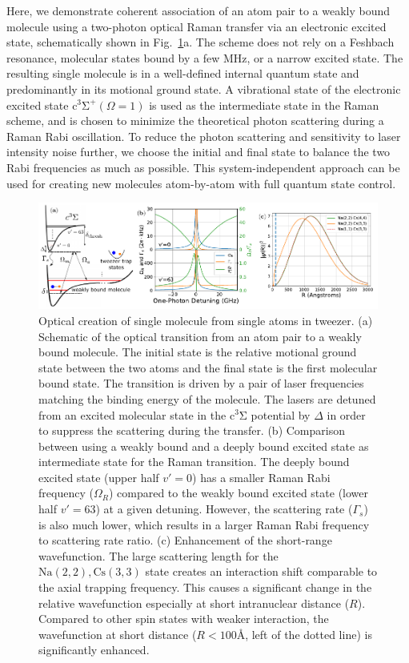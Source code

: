 \documentclass[aps,prl,twocolumn,10pt,superscriptaddress]{revtex4-1}
\newcommand{\Na}{\mathrm{Na}}
\newcommand{\Cs}{\mathrm{Cs}}
\begin{document}
Here, we demonstrate coherent association of an atom pair to a weakly bound molecule
using a two-photon optical Raman transfer via an electronic excited state,
schematically shown in Fig.~\ref{f-theory}a.
The scheme does not rely on a Feshbach resonance,
molecular states bound by a few MHz, or a narrow excited state.
The resulting single molecule is in a well-defined internal quantum state
and predominantly in its motional ground state.
A vibrational state of the electronic excited state $\mathrm{c^3\Sigma^+}(\Omega = 1)$
is used as the intermediate state in the Raman scheme,
and is chosen to minimize the theoretical photon scattering during a Raman Rabi oscillation.
To reduce the photon scattering and sensitivity to laser intensity noise further,
we choose the initial and final state to balance the two Rabi frequencies as much as possible.
This system-independent approach can be used for creating new molecules atom-by-atom
with full quantum state control.


\begin{figure}
  \includegraphics[width=\textwidth]{fig1.pdf}
  \caption{Optical creation of single molecule from single atoms in tweezer.
    (a) Schematic of the optical transition from an atom pair to a weakly bound molecule.
    The initial state is the relative motional ground state between the two atoms
    and the final state is the first molecular bound state.
    The transition is driven by a pair of laser frequencies matching the binding energy
    of the molecule.
    The lasers are detuned from an excited molecular state in the $\mathrm{c^3\Sigma}$ potential
    by $\Delta$ in order to suppress the scattering during the transfer.
    (b) Comparison between using a weakly bound and a deeply bound excited state
    as intermediate state for the Raman transition.
    The deeply bound excited state (upper half $v'=0$)
    has a smaller Raman Rabi frequency ($\Omega_{R}$)
    compared to the weakly bound excited state (lower half $v'=63$) at a given detuning.
    However, the scattering rate ($\Gamma_{s}$) is also much lower,
    which results in a larger Raman Rabi frequency to scattering rate ratio.
    (c) Enhancement of the short-range wavefunction.
    The large scattering length for the $\Na(2,2),\Cs(3,3)$ state creates an interaction shift
    comparable to the axial trapping frequency.
    This causes a significant change in the relative wavefunction especially at short
    intranuclear distance ($R$).
    Compared to other spin states with weaker interaction,
    the wavefunction at short distance ($R<100\text{\AA}$, left of the dotted line)
    is significantly enhanced.
    \label{f-theory}
  }
\end{figure}
\end{document}
